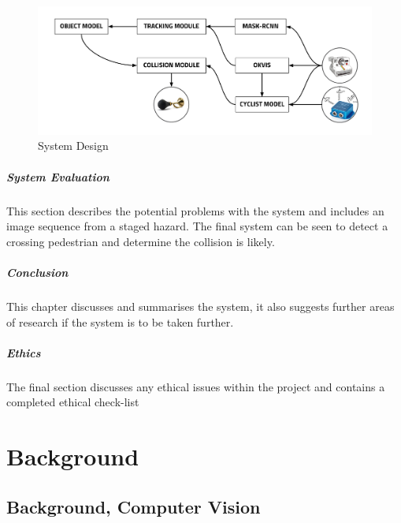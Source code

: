 \documentclass[11pt,twoside]{report}
\begin{document}
\noindent \begin{figure}[h!]
	\includegraphics[width = 1.0\hsize]{figures/software_architecture.png}
	\caption{System Design}
	\label{software_soln1}
\end{figure}


\paragraph{System Evaluation}
This section describes the potential problems with the system and includes an image sequence from a staged hazard. The final system can be seen to detect a crossing pedestrian and determine the collision is likely.

\paragraph{Conclusion}
This chapter discusses and summarises the system, it also suggests further areas of research if the system is to be taken further.

\paragraph{Ethics}
The final section discusses any ethical issues within the project and contains a completed ethical check-list


\newpage



\chapter{Background}
\section{Background, Computer Vision}\label{comp_vis_back}
\end{document}
